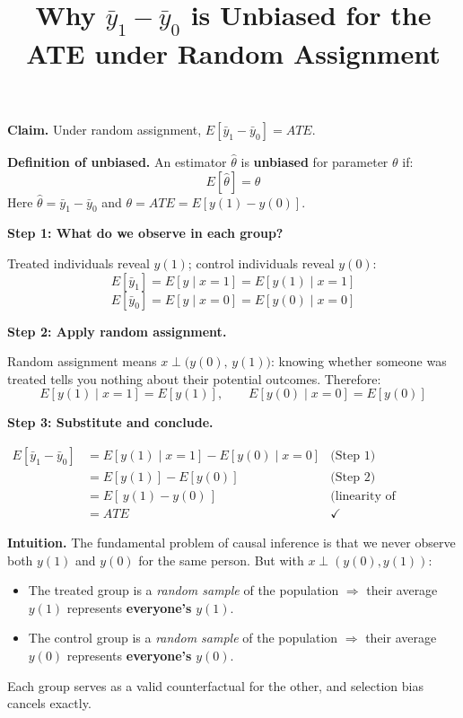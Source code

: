 \documentclass[12pt]{article}
\title{Why $\bar{y}_1 - \bar{y}_0$ is Unbiased for the ATE under Random Assignment}
\author{}
\date{}
\begin{document}
\maketitle

\textbf{Claim.} Under random assignment, $E[\bar{y}_1 - \bar{y}_0] = ATE$.

\bigskip

\textbf{Definition of unbiased.} An estimator $\hat{\theta}$ is \textbf{unbiased}
for parameter $\theta$ if:
\[
  E[\hat{\theta}] = \theta
\]
Here $\hat{\theta} = \bar{y}_1 - \bar{y}_0$ and $\theta = ATE = E[y(1) - y(0)]$.

\bigskip

\textbf{Step 1: What do we observe in each group?}

\medskip
Treated individuals reveal $y(1)$; control individuals reveal $y(0)$:
\[
  E[\bar{y}_1] = E[y \mid x=1] = E[y(1) \mid x=1]
\]
\[
  E[\bar{y}_0] = E[y \mid x=0] = E[y(0) \mid x=0]
\]

\bigskip

\textbf{Step 2: Apply random assignment.}

\medskip
Random assignment means $x \perp \bigl(y(0),\, y(1)\bigr)$: knowing whether
someone was treated tells you nothing about their potential outcomes. Therefore:
\[
  E[y(1) \mid x=1] = E[y(1)], \qquad E[y(0) \mid x=0] = E[y(0)]
\]

\bigskip

\textbf{Step 3: Substitute and conclude.}

\begin{align*}
  E[\bar{y}_1 - \bar{y}_0]
    &= E[y(1) \mid x=1] - E[y(0) \mid x=0] & \text{(Step 1)}\\
    &= E[y(1)] - E[y(0)]                    & \text{(Step 2)}\\
    &= E[\,y(1) - y(0)\,]                   & \text{(linearity of expectation)}\\
    &= ATE                                   & \checkmark
\end{align*}

\bigskip

\textbf{Intuition.} The fundamental problem of causal inference is that we never
observe both $y(1)$ and $y(0)$ for the same person. But with
$x \perp (y(0), y(1))$:
\begin{itemize}
  \item The treated group is a \emph{random sample} of the population
        $\Rightarrow$ their average $y(1)$ represents \textbf{everyone's} $y(1)$.
  \item The control group is a \emph{random sample} of the population
        $\Rightarrow$ their average $y(0)$ represents \textbf{everyone's} $y(0)$.
\end{itemize}
Each group serves as a valid counterfactual for the other, and selection bias
cancels exactly.
\end{document}
